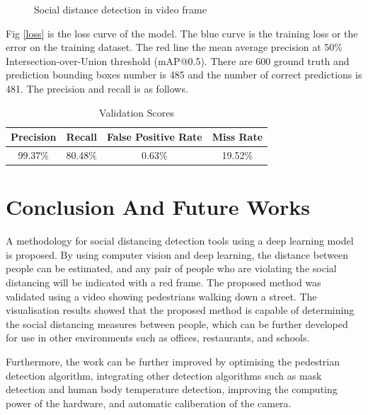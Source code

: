 \documentclass{svproc}
\begin{document}
\begin{figure}[!h]
\begin{subfigure}[b]{0.8\columnwidth}
		\caption{}
	\end{subfigure}
	\caption{Social distance detection in video frame}
	\label{output}
\end{figure}

Fig \ref{loss} is the loss curve of the model. The blue curve is the training loss or the error on the training dataset. The red line the mean average precision at 50\% Intersection-over-Union threshold (mAP@0.5). There are 600 ground truth and prediction bounding boxes number is 485 and the number of correct predictions is 481. The precision and recall is as follows.
\\
\begin{table}[!h]
	\centering
	\begin{tabular}{|c|c|c|c|}
		\hline
		\textbf{Precision} & \textbf{Recall} & \textbf{False Positive Rate} & \textbf{Miss Rate} \\
		\hline
		99.37\% & 80.48\% & 0.63\% & 19.52\% \\
		\hline
	\end{tabular}
	\caption{Validation Scores}
	\label{val}  
\end{table}

\section{Conclusion And Future Works}
A methodology for social distancing detection tools using a deep learning model is proposed. By using computer vision and deep learning, the distance between people can be estimated, and any pair of people who are violating the social distancing will be indicated with a red frame. The proposed method was validated using a video showing pedestrians walking down a street. The visualisation results showed that the proposed method is capable of determining the social distancing measures between people, which can be further developed for use in other environments such as offices, restaurants, and schools.
\par
Furthermore, the work can be further improved by optimising the pedestrian detection algorithm, integrating other detection algorithms such as mask detection and human body temperature detection, improving the computing power of the hardware, and automatic caliberation of the camera.
\end{document}
